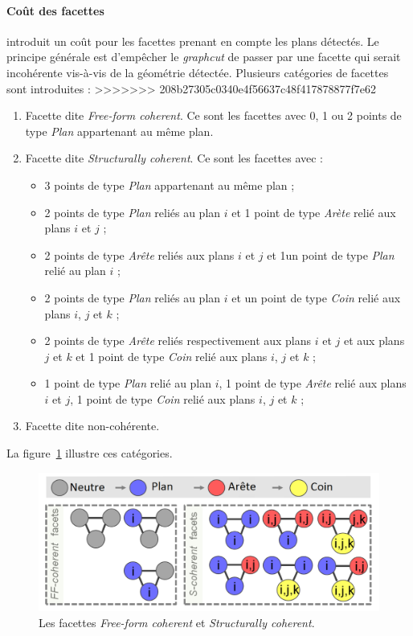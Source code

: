 ﻿\documentclass[12pt, twoside]{article}
\begin{document}
\paragraph{Coût des facettes} \cite{maillage2} introduit un coût pour les facettes prenant en compte les plans détectés. Le principe générale est d'empêcher le \textit{graphcut} de passer par une facette qui serait incohérente vis-à-vis de la géométrie détectée. Plusieurs catégories de facettes sont introduites :
>>>>>>> 208b27305c0340e4f56637c48f417878877f7e62
\begin{enumerate}
  \item Facette dite \textit{Free-form coherent}. Ce sont les facettes avec 0, 1 ou 2 points de type \textit{Plan} appartenant au même plan.
  \item Facette dite \textit{Structurally coherent}. Ce sont les facettes avec :
  \begin{itemize}
    \item 3 points de type \textit{Plan} appartenant au même plan ;
    \item 2 points de type \textit{Plan} reliés au plan $i$ et 1 point de type \textit{Arète} relié aux plans $i$ et $j$ ;
    \item 2 points de type \textit{Arête} reliés aux plans $i$ et $j$ et 1un point de type \textit{Plan} relié au plan $i$ ;
    \item 2 points de type \textit{Plan} reliés au plan $i$ et un point de type \textit{Coin} relié aux plans $i$, $j$ et $k$ ;
    \item 2 points de type \textit{Arête} reliés respectivement aux plans $i$ et $j$ et aux plans $j$ et $k$ et 1 point de type \textit{Coin} relié aux plans $i$, $j$ et $k$ ;
    \item 1 point de type \textit{Plan} relié au plan $i$, 1 point de type \textit{Arête} relié aux plans $i$ et $j$, 1 point de type \textit{Coin} relié aux plans $i$, $j$ et $k$ ;
  \end{itemize}
  \item Facette dite non-cohérente.
\end{enumerate}

La figure~\ref{fig:coherence} illustre ces catégories.

\begin{figure}[h]
\centering
\includegraphics[scale=0.4]{coherent.png}
\caption{\label{fig:coherence} Les facettes \textit{Free-form coherent} et \textit{Structurally coherent}.}
\end{figure}
\end{document}
